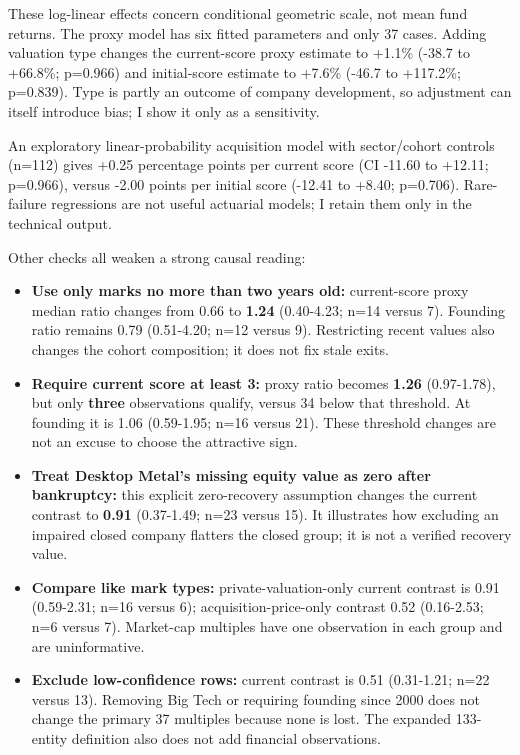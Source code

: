 These log-linear effects concern conditional geometric scale, not mean
fund returns. The proxy model has six fitted parameters and only 37
cases. Adding valuation type changes the current-score proxy estimate to
+1.1\% (-38.7 to +66.8\%; p=0.966) and initial-score estimate to +7.6\%
(-46.7 to +117.2\%; p=0.839). Type is partly an outcome of company
development, so adjustment can itself introduce bias; I show it only as
a sensitivity.

An exploratory linear-probability acquisition model with sector/cohort
controls (n=112) gives +0.25 percentage points per current score (CI
-11.60 to +12.11; p=0.966), versus -2.00 points per initial score
(-12.41 to +8.40; p=0.706). Rare-failure regressions are not useful
actuarial models; I retain them only in the technical output.

Other checks all weaken a strong causal reading:

\begin{itemize}
\tightlist
\item
  \textbf{Use only marks no more than two years old:} current-score
  proxy median ratio changes from 0.66 to \textbf{1.24} (0.40-4.23; n=14
  versus 7). Founding ratio remains 0.79 (0.51-4.20; n=12 versus 9).
  Restricting recent values also changes the cohort composition; it does
  not fix stale exits.
\item
  \textbf{Require current score at least 3:} proxy ratio becomes
  \textbf{1.26} (0.97-1.78), but only \textbf{three} observations
  qualify, versus 34 below that threshold. At founding it is 1.06
  (0.59-1.95; n=16 versus 21). These threshold changes are not an excuse
  to choose the attractive sign.
\item
  \textbf{Treat Desktop Metal's missing equity value as zero after
  bankruptcy:} this explicit zero-recovery assumption changes the
  current contrast to \textbf{0.91} (0.37-1.49; n=23 versus 15). It
  illustrates how excluding an impaired closed company flatters the
  closed group; it is not a verified recovery value.
\item
  \textbf{Compare like mark types:} private-valuation-only current
  contrast is 0.91 (0.59-2.31; n=16 versus 6); acquisition-price-only
  contrast 0.52 (0.16-2.53; n=6 versus 7). Market-cap multiples have one
  observation in each group and are uninformative.
\item
  \textbf{Exclude low-confidence rows:} current contrast is 0.51
  (0.31-1.21; n=22 versus 13). Removing Big Tech or requiring founding
  since 2000 does not change the primary 37 multiples because none is
  lost. The expanded 133-entity definition also does not add financial
  observations.
\end{itemize}


